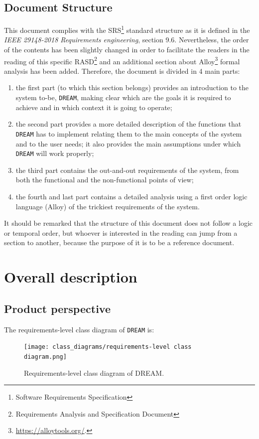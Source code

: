 \documentclass{article}
\begin{document}
\subsection{Document Structure}
This document complies with the SRS\footnote{Software Requirements Specification} standard structure as it is defined in the \textit{IEEE 29148-2018 Requirements engineering}, section 9.6. Nevertheless, the order of the contents has been slightly changed in order to facilitate the readers in the reading of this specific RASD\footnote{Requirements Analysis and Specification Document} and an additional section about Alloy\footnote{\url{https://alloytools.org/}.} formal analysis has been added.
Therefore, the document is divided in 4 main parts:
\begin{enumerate}
\item the first part (to which this section belongs) provides an introduction to the system to-be, \verb|DREAM|, making clear which are the goals it is required to achieve and in which context it is going to operate;
\item the second part provides a more detailed description of the functions that \verb|DREAM| has to implement relating them to the main concepts of the system and to the user needs; it also provides the main assumptions under which \verb|DREAM| will work properly;

\item the third part contains the out-and-out requirements of the system, from both the functional and the non-functional points of view;
\item the fourth and last part contains a detailed analysis using a first order logic language (Alloy) of the trickiest requirements of the system.
\end{enumerate}
It should be remarked that the structure of this document does not follow a logic or temporal order, but whoever is interested in the reading can jump from a section to another, because the purpose of it is to be a reference document.

\section{Overall description}
\subsection{Product perspective}
The requirements-level class diagram of \verb|DREAM| is:
\begin{figure}[H]
    \centering
	\texttt{[image: class\_diagrams/requirements-level class diagram.png]}
    \caption{Requirements-level class diagram of DREAM.}
\end{figure}
\end{document}
